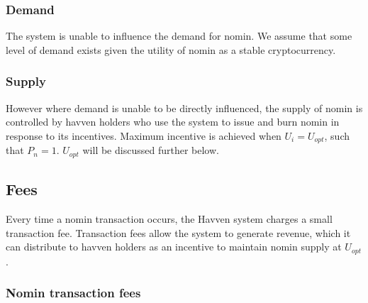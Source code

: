 \begin{center}
\end{center}
	
\subsubsection*{Demand}

\noindent The system is unable to influence the demand for nomin. We assume that some level of demand exists given the utility of nomin as a stable cryptocurrency.

\subsubsection*{Supply}

\noindent However where demand is unable to be directly influenced, the supply of nomin is controlled by havven holders who use the system to issue and burn nomin in response to its incentives. Maximum incentive is achieved when $U_i = U_{opt}$, such that $P_n = 1$. $U_{opt}$ will be discussed further below. \\

\newpage
\subsection{Fees} Every time a nomin transaction occurs, the Havven system charges a small transaction fee. Transaction fees allow the system to generate revenue, which it can distribute to havven holders as an incentive to maintain nomin supply at $U_{opt}$.

\subsubsection{Nomin transaction fees}


